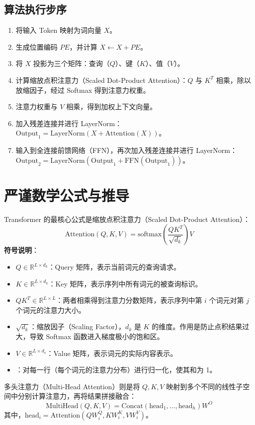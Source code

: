 \documentclass[12pt, a4paper]{book}
\begin{document}
\subsection{算法执行步序}
\begin{enumerate}
    \item 将输入 Token 映射为词向量 $X$。
    \item 生成位置编码 $PE$，并计算 $X \leftarrow X + PE$。
    \item 将 $X$ 投影为三个矩阵：查询（$Q$）、键（$K$）、值（$V$）。
    \item 计算缩放点积注意力（Scaled Dot-Product Attention）：$Q$ 与 $K^T$ 相乘，除以放缩因子，经过 Softmax 得到注意力权重。
    \item 注意力权重与 $V$ 相乘，得到加权上下文向量。
    \item 加入残差连接并进行 LayerNorm：$\text{Output}_1 = \text{LayerNorm}(X + \text{Attention}(X))$。
    \item 输入到全连接前馈网络（FFN），再次加入残差连接并进行 LayerNorm：$\text{Output}_2 = \text{LayerNorm}(\text{Output}_1 + \text{FFN}(\text{Output}_1))$。
\end{enumerate}

\section{严谨数学公式与推导}
Transformer 的最核心公式是缩放点积注意力（Scaled Dot-Product Attention）：
$$
\text{Attention}(Q,K,V) = \text{softmax}\left(\frac{QK^T}{\sqrt{d_k}}\right)V
$$
\textbf{符号说明}：
\begin{itemize}
    \item $Q \in \mathbb{R}^{L \times d_k}$：Query 矩阵，表示当前词元的查询请求。
    \item $K \in \mathbb{R}^{L \times d_k}$：Key 矩阵，表示序列中所有词元的被查询标识。
    \item $QK^T \in \mathbb{R}^{L \times L}$：两者相乘得到注意力分数矩阵，表示序列中第 $i$ 个词元对第 $j$ 个词元的注意力大小。
    \item $\sqrt{d_k}$：缩放因子（Scaling Factor），$d_k$ 是 $K$ 的维度。作用是防止点积结果过大，导致 Softmax 函数进入梯度极小的饱和区。
    \item $V \in \mathbb{R}^{L \times d_v}$：Value 矩阵，表示词元的实际内容表示。
    \item {}：对每一行（每个词元的注意力分布）进行归一化，使其和为 1。
\end{itemize}

多头注意力（Multi-Head Attention）则是将 $Q, K, V$ 映射到多个不同的线性子空间中分别计算注意力，再将结果拼接融合：
$$
\text{MultiHead}(Q,K,V) = \text{Concat}(\text{head}_1, \dots, \text{head}_h) W^O
$$
其中，$\text{head}_i = \text{Attention}(Q W_i^Q, K W_i^K, V W_i^V)$。
\end{document}
